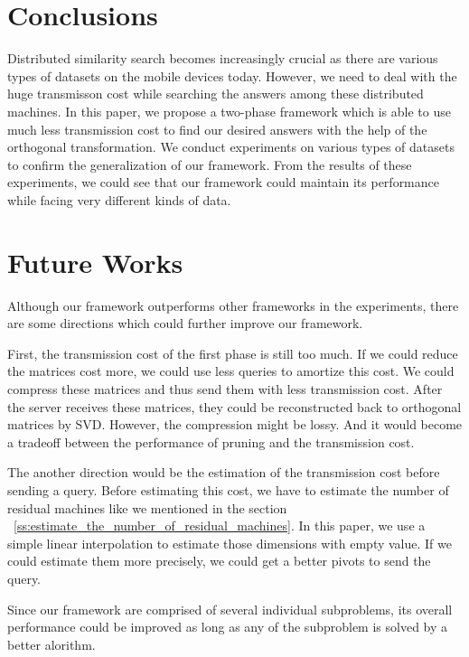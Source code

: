 \chapter{Conclusions}
\label{c:conclusions}

Distributed similarity search becomes increasingly crucial as there are various types of datasets on the mobile devices today.  However, we need to deal with the huge transmisson cost while searching the answers among these distributed machines.  In this paper, we propose a two-phase framework which is able to use much less transmission cost to find our desired answers with the help of the orthogonal transformation.  We conduct experiments on various types of datasets to confirm the generalization of our framework.  From the results of these experiments, we could see that our framework could maintain its performance while facing very different kinds of data.

\chapter{Future Works}
\label{c:future}

Although our framework outperforms other frameworks in the experiments, there are some directions which could further improve our framework.  

First, the transmission cost of the first phase is still too much.  If we could reduce the matrices cost more, we could use less queries to amortize this cost.  We could compress these matrices and thus send them with less transmission cost.  After the server receives these matrices, they could be reconstructed back to orthogonal matrices by SVD.  However, the compression might be lossy.  And it would become a tradeoff between the performance of pruning and the transmission cost.

The another direction would be the estimation of the transmission cost before sending a query.  Before estimating this cost, we have to estimate the number of residual machines like we mentioned in the section ~\ref{ss:estimate_the_number_of_residual_machines}.  In this paper, we use a simple linear interpolation to estimate those dimensions with empty value.  If we could estimate them more precisely, we could get a better pivots to send the query.

Since our framework are comprised of several individual subproblems, its overall performance could be improved as long as any of the subproblem is solved by a better alorithm.
